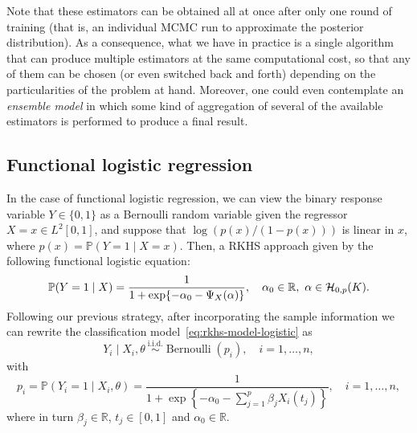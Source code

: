 \documentclass[ba]{imsart}
\numberwithin{equation}{section}
\theoremstyle{plain}
\newcommand{\R}{\mathbb{R}}
\newcommand{\Hcal}{\ensuremath\mathcal{H}}
\newenvironment{comment}[1][comment-red]
{
\noindent \color{#1}
}
{
\color{black}
}
\begin{document}
Note that these estimators can be obtained all at once after only one round of training (that is, an individual MCMC run to approximate the posterior distribution). As a consequence, what we have in practice is a single algorithm that can produce multiple estimators at the same computational cost, so that any of them can be chosen (or even switched back and forth) depending on the particularities of the problem at hand. Moreover, one could even contemplate an \textit{ensemble model} in which some kind of aggregation of several of the available estimators is performed to produce a final result.

\begin{comment}

\end{comment}

\subsection{Functional logistic regression}\label{sec:rkhs-logistic-model}

In the case of functional logistic regression, we can view the binary response variable \(Y\in\{0, 1\}\) as a Bernoulli random variable given the regressor \(X=x \in L^2[0, 1]\), and suppose that \(\log\left(p(x)/(1-p(x))\right)\) is linear in \(x\), where \(p(x)=\mathbb P(Y=1\mid X=x)\). Then, a RKHS approach given by the following functional logistic equation:
\begin{equation}\label{eq:rkhs-model-logistic}
  \mathbb P(Y=1 \mid X) = \frac{1}{1 + \exp\{-\alpha_0 - \Psi_X(\alpha)\}}, \quad \alpha_0 \in \R, \ \alpha \in \Hcal_{0,p}(K).
\end{equation}
Following our previous strategy, after incorporating the sample information we can rewrite the classification model~\eqref{eq:rkhs-model-logistic} as
\begin{equation}\label{eq:rkhs-model-logistic-2}
Y_i \mid X_i,\theta \ \stackrel{\text{i.i.d.}}{\sim} \operatorname{Bernoulli}(p_i), \quad i=1,\dots, n,
\end{equation}
with
\begin{equation}\label{eq:rkhs-model-logistic-2-parameter}
  p_i = \mathbb P(Y_i=1 \mid X_i,\theta) = \frac{1}{\displaystyle 1 + \exp\left\{-\alpha_0 - \sum_{j=1}^p \beta_j X_i(t_j)\right\}}, \quad i=1,\dots, n,
\end{equation}
where in turn \(\beta_j\in\R\), \(t_j\in[0, 1]\) and \(\alpha_0\in\R\).
\end{document}
